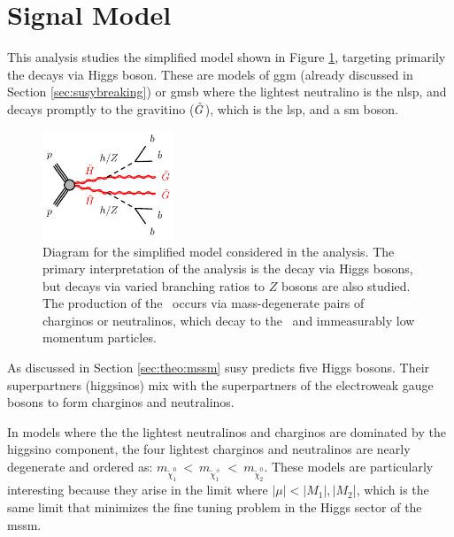
\section{Signal Model}
\label{sec:ewk:sig}

This analysis studies the simplified model shown in Figure \ref{fig:feyn}, targeting primarily the decays via Higgs boson.
These are models of \gls{ggm} \cite{Meade:2008wd,Cheung:2007es,Dine:1981gu,AlvarezGaume:1981wy,Nappi:1982hm} 
(already discussed in Section \ref{sec:susybreaking})
or \gls{gmsb} \cite{Dimopoulos:1996vz,Matchev:1999ft} where 
the lightest neutralino is the \gls{nlsp}, and decays promptly to the gravitino ($\tilde{G}$), which is the \gls{lsp}, and 
a \gls{sm} boson. 

\begin{figure}[htbp]
	\centering
	\includegraphics[width=0.35\textwidth]{figures/ewk_prod/varie/N1N1-hhGG-bbbb_Z}
	\caption{Diagram for the simplified model considered in the analysis. The primary interpretation of the analysis is the decay via Higgs bosons, but decays via varied branching ratios to $Z$ bosons are also studied. The production of the \hino\ occurs
via mass-degenerate pairs of charginos or neutralinos, which decay to the \ninoone\ and immeasurably low momentum particles.} 
	\label{fig:feyn}
\end{figure}

As discussed in Section \ref{sec:theo:mssm} \gls{susy} predicts five Higgs bosons. 
Their superpartners (higgsinos) mix with the superpartners of the electroweak gauge bosons to form charginos and neutralinos.

In models where the the lightest neutralinos and charginos are dominated by the higgsino component, the four lightest charginos 
and neutralinos are nearly degenerate \cite{Papucci:2011wy,Barbieri:2009ev,Han:2014kaa} and ordered as: $m_{\tilde\chi^0_1}~<~m_{\tilde\chi^\pm_1}~<~m_{\tilde\chi^0_2}$.
These models are particularly interesting because they arise in the limit where $|\mu| < |M_1|, |M_2$|, which is the same limit 
that minimizes the fine tuning problem in the Higgs sector of the \gls{mssm}.

